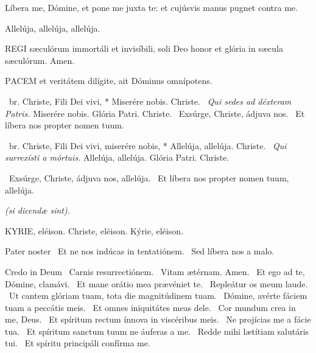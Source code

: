 
 Líbera me, Dómine, et pone me juxta te: et cujúsvis manus pugnet contra me.

  Allelúja, allelúja, allelúja.



\lettrine[lines=2]{R}{EGI} sæculórum immortáli et invisíbili, soli Deo honor et glória in sæcula sæculórum. Amen.



\lettrine[lines=2]{P}{ACEM} et veritátem dilígite, ait Dóminus omnípotens.

\R\ br. Christe, Fili Dei vivi, * Miserére nobis. Christe. \V\ \textit{Qui sedes ad déxteram Patris.} Miserére nobis. Glória Patri. Christe. \V\ Exsúrge, Christe, ádjuva nos. \R\ Et líbera nos propter nomen tuum.



\R\ br. Christe, Fili Dei vivi, miserére nobis, * Allelúja, allelúja. Christe. \V\ \textit{Qui surrexísti a mórtuis.} Allelúja, allelúja. Glória Patri. Christe.

\V\ Exsúrge, Christe, ádjuva nos, allelúja. \R\ Et líbera nos propter nomen tuum, allelúja.

\sectionornament


\textit{(si dicendæ sint).}

KYRIE, eléison. Christe, eléison. Kýrie, eléison.

Pater noster  \V\ Et ne nos indúcas in tentatiónem. \R\ Sed líbera nos a malo.

Credo in Deum  \V\ Carnis resurrectiónem. \R\ Vitam ætérnam. Amen. \V\ Et ego ad te, Dómine, clamávi. \R\ Et mane orátio mea prævéniet te. \V\ Repleátur os meum laude. \R\ Ut cantem glóriam tuam, tota die magnitúdinem tuam. \V\ Dómine, avérte fáciem tuam a peccátis meis. \R\ Et omnes iniquitátes meas dele. \V\ Cor mundum crea in me, Deus. \R\ Et spíritum rectum ínnova in viscéribus meis. \V\ Ne projícias me a fácie tua. \R\ Et spíritum sanctum tuum ne áuferas a me. \V\ Redde mihi lætítiam salutáris tui. \R\ Et spíritu principáli confírma me.

